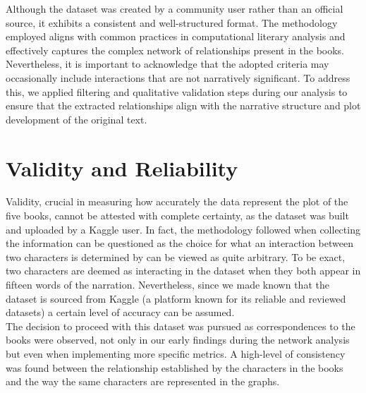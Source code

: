 \documentclass[12pt, a4paper]{article}
\begin{document}
Although the dataset was created by a community user rather than an official source, it exhibits a consistent and well-structured format. The methodology employed aligns with common practices in computational literary analysis and effectively captures the complex network of relationships present in the books. Nevertheless, it is important to acknowledge that the adopted criteria may occasionally include interactions that are not narratively significant. To address this, we applied filtering and qualitative validation steps during our analysis to ensure that the extracted relationships align with the narrative structure and plot development of the original text.


\section{Validity and Reliability}
\begin{comment}
(Spiegare il fatto che il dataset sia cotruito da un utente di Kaggle e quindi puo' essere non preciso, ma osservare anche che essendo preso da Kaggle ha soprattutto dopo il calcolo delle metriche abbiamo comunque osservato che c'e' coerenza con quanto scritto nei libri. clique servono come conferma della coerenza del dataset con la trama dei 5 libri)
How closely does the model of your dataset represent reality (validity)?
How does the way you treat the data affect the reproducibility of the study (reliability)?
\end{comment}
\label{validity-and-reliability-not-needed-for-the-project-proposal}
Validity, crucial in measuring how accurately the data represent the plot of the five books, cannot be attested with complete certainty, as the dataset was built and uploaded by a Kaggle user. 
In fact, the methodology followed when collecting the information can be questioned as the choice for what an interaction between two characters is determined by can be viewed as quite arbitrary. To be exact, two characters are deemed as interacting in the dataset when they both appear in fifteen words of the narration. Nevertheless, since we made known that the dataset is sourced from Kaggle (a platform known for its reliable and reviewed datasets) a certain level of accuracy can be assumed. \\
The decision to proceed with this dataset was pursued as correspondences to the books were observed, not only in our early findings during the network analysis but even when implementing more specific metrics. A high-level of consistency was found between the relationship established by the characters in the books and the way the same characters are represented in the graphs.
\end{document}
